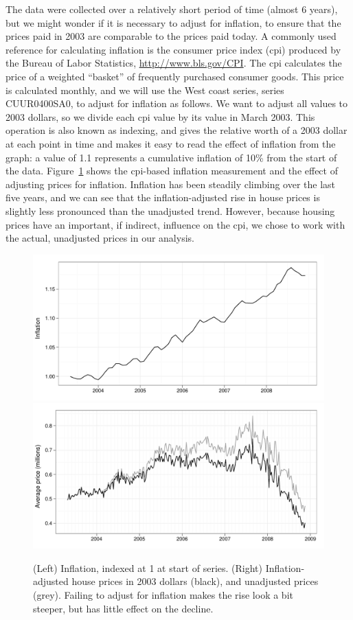 \documentclass[oneside]{article}
\begin{document}
The data were collected over a relatively short period of time (almost 6 years), but we might wonder if it is necessary to adjust for inflation, to ensure that the prices paid in 2003 are comparable to the prices paid today.  A commonly used reference for calculating inflation is the consumer price index ({\sc cpi}) produced by the Bureau of Labor Statistics, \url{http://www.bls.gov/CPI}.  The {\sc cpi} calculates the price of a weighted ``basket'' of frequently purchased consumer goods.  This price is calculated monthly, and we will use the West coast series, series CUUR0400SA0, to adjust for inflation as follows.  We want to adjust all values to 2003 dollars, so we divide each {\sc cpi} value by its value in March 2003.  This operation is also known as indexing, and gives the relative worth of a 2003 dollar at each point in time and makes it easy to read the effect of inflation from the graph: a value of 1.1 represents a cumulative inflation of 10\% from the start of the data.  
Figure~\ref{fig:inflation} shows the {\sc cpi}-based inflation measurement and the effect of adjusting prices for inflation.  Inflation has been steadily climbing over the last five years, and we can see that the inflation-adjusted rise in house prices is slightly less pronounced than the unadjusted trend. However, because housing prices have an important, if indirect, influence on the {\sc cpi}, we chose to work with the actual, unadjusted prices in our analysis.

\begin{figure}[htbp]
  \centering
    \includegraphics[width=0.5 \linewidth]{daily-cpi}%
    \includegraphics[width=0.5 \linewidth]{daily-price-adj}
  \caption{(Left) Inflation, indexed at 1 at start of series.  (Right) Inflation-adjusted house prices in 2003 dollars (black), and unadjusted prices (grey).  Failing to adjust for inflation makes the rise look a bit steeper, but has little effect on the decline.}
  \label{fig:inflation}
\end{figure}
\end{document}
